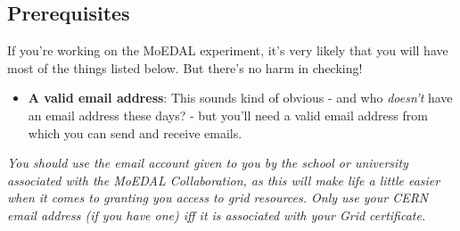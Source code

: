 \subsection{Prerequisites}
\label{sec:prerequisites}
If you're working on the \ac{MoEDAL} experiment,
it's very likely that you will have most of the things listed below.
But there's no harm in checking!

\begin{itemize}
\tightlist
\item
  \textbf{A valid email address}: This sounds kind of obvious - and who
  \emph{doesn't} have an email address these days? - but you'll need a
  valid email address from which you can send and receive emails.
\end{itemize}

\begin{tcolorbox}[title=Institutional email accounts]
\emph{You should use the email account
given to you by the school or university associated with the
\ac{MoEDAL} Collaboration, as this
will make life a little easier when it comes to granting you access to
grid resources. Only use your \acs{CERN} email address (if you have one)
iff it is associated with your Grid certificate.}
\end{tcolorbox}

